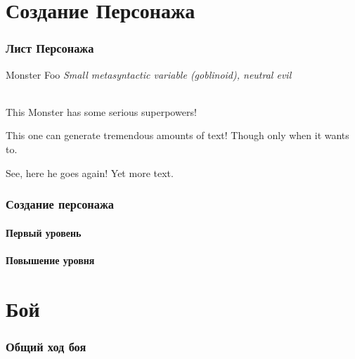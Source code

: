 \documentclass[10pt,twoside,twocolumn,openany]{book}
\begin{document}
\selectfont
\tableofcontents

\clearpage
\part{Создание Персонажа}
\onecolumn
\section{Лист Персонажа}
\begin{monsterbox}{Monster Foo}
	\textit{Small metasyntactic variable (goblinoid), neutral evil}\\
	\hline
	\stats[STR = \stat{8}, DEX = \stat{9}, CON = \stat{10}, INT = \stat{35}, WIT = \stat{38}, WIL = \stat{50}]
	\hline
	\basics[armorclass = 12, hitpoints = 16 (3d8+3), speed = 50 ft]
	\hline
	\details[languages = {Common Lisp, Erlang},]
	\hline \\[1mm]
	\begin{monsteraction}
		This Monster has some serious superpowers!
	\end{monsteraction}
	\begin{monsteraction}
		This one can generate tremendous amounts of text! Though only when it wants to.
	\end{monsteraction}
	\begin{monsteraction}
		See, here he goes again! Yet more text.
	\end{monsteraction}
\end{monsterbox}
\twocolumn
\clearpage

\section{Создание персонажа}
\lipsum[1]
\subsection{Первый уровень}
\lipsum[1]
\subsection{Повышение уровня}
\lipsum[1]

\part{Бой}
\section{Общий ход боя}
\lipsum[1]
\end{document}
